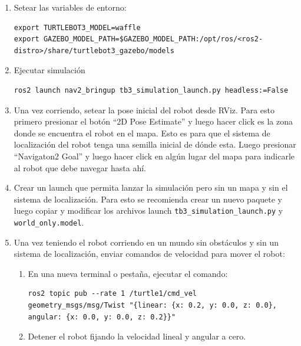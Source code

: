 \documentclass[tp]{lcc}
\begin{document}
\begin{enumerate}

\item Setear las variables de entorno:

\begin{lstlisting}[style=bash] 
export TURTLEBOT3_MODEL=waffle
export GAZEBO_MODEL_PATH=$GAZEBO_MODEL_PATH:/opt/ros/<ros2-distro>/share/turtlebot3_gazebo/models
\end{lstlisting}
	\item Ejecutar simulación

\begin{lstlisting}[style=bash] 
ros2 launch nav2_bringup tb3_simulation_launch.py headless:=False
\end{lstlisting}


	\item Una vez corriendo, setear la pose inicial del robot desde RViz. Para esto primero presionar el botón ``2D Pose Estimate'' y luego hacer click es la zona donde se encuentra el robot en el mapa. Esto es para que el sistema de localización del robot tenga una semilla inicial de dónde esta. Luego presionar ``Navigaton2 Goal'' y luego hacer click en algún lugar del mapa para indicarle al robot que debe navegar hasta ahí.

	\item Crear un launch que permita lanzar la simulación pero sin un mapa y sin el sistema de localización. Para esto se recomienda crear un nuevo paquete y luego copiar y modificar los archivos launch \lstinline{tb3_simulation_launch.py} y \lstinline{world_only.model}.

	\item Una vez teniendo el robot corriendo en un mundo sin obstáculos y sin un sistema de localización, enviar comandos de velocidad para mover el robot:

	\begin{enumerate}
	\item En una nueva terminal o pestaña, ejecutar el comando:

\begin{lstlisting}[style=bash] 
ros2 topic pub --rate 1 /turtle1/cmd_vel geometry_msgs/msg/Twist "{linear: {x: 0.2, y: 0.0, z: 0.0}, angular: {x: 0.0, y: 0.0, z: 0.2}}"
\end{lstlisting}

	\item Detener el robot fijando la velocidad lineal y angular a cero.
	\end{enumerate}


\end{enumerate}
\end{document}
